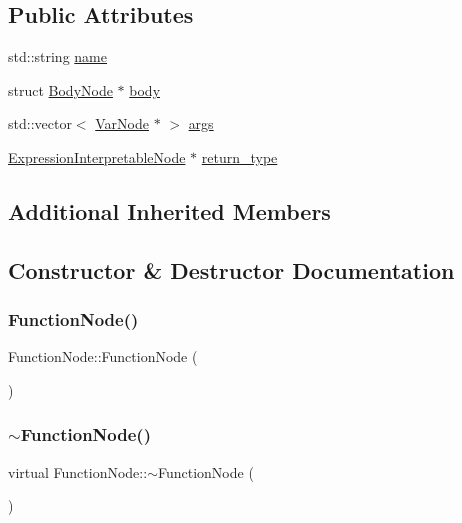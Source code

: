 \subsection*{Public Attributes}
\begin{DoxyCompactItemize}
\item 
std\+::string \hyperlink{classFunctionNode_a21284dd655c91da1f792dc3bc1bba60c}{name}
\item 
struct \hyperlink{classBodyNode}{Body\+Node} $\ast$ \hyperlink{classFunctionNode_a3ebe1489837aee643b7e9f626ef0976a}{body}
\item 
std\+::vector$<$ \hyperlink{classVarNode}{Var\+Node} $\ast$ $>$ \hyperlink{classFunctionNode_a04bfceaf29255ffd83195f669b5c37ef}{args}
\item 
\hyperlink{classExpressionInterpretableNode}{Expression\+Interpretable\+Node} $\ast$ \hyperlink{classFunctionNode_aaabd8ce2540b12cf113a0cb8082c3397}{return\+\_\+type}
\end{DoxyCompactItemize}
\subsection*{Additional Inherited Members}


\subsection{Constructor \& Destructor Documentation}
\mbox{\label{classFunctionNode_ac4467a4c13382e0058cb2bd4fb70e0ab}} 
\subsubsection{\texorpdfstring{Function\+Node()}{FunctionNode()}}
{\footnotesize\ttfamily Function\+Node\+::\+Function\+Node (\begin{DoxyParamCaption}{ }\end{DoxyParamCaption})}

\mbox{\label{classFunctionNode_ad9c4a35db175de9386ac86d91a1a95df}} 
\subsubsection{\texorpdfstring{$\sim$\+Function\+Node()}{~FunctionNode()}}
{\footnotesize\ttfamily virtual Function\+Node\+::$\sim$\+Function\+Node (\begin{DoxyParamCaption}{ }\end{DoxyParamCaption})\hspace{0.3cm}{\ttfamily [virtual]}}



